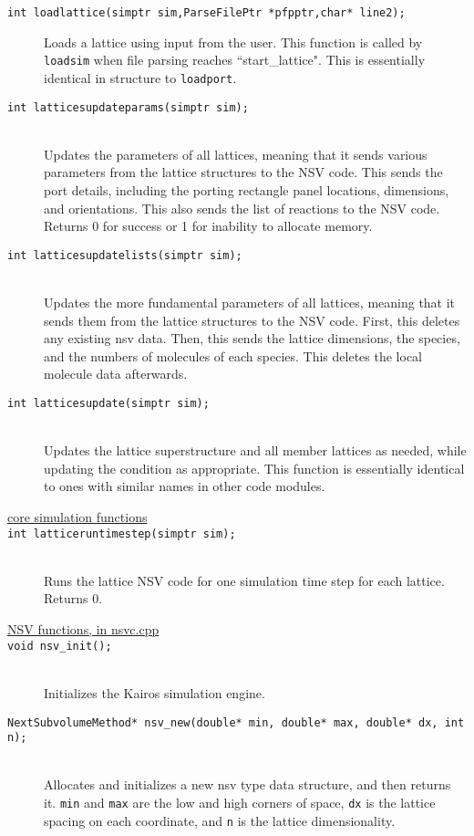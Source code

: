 \documentclass {book}
\begin{document}
\begin{description}
\item[\texttt{int loadlattice(simptr sim,ParseFilePtr *pfpptr,char* line2);}]
Loads a lattice using input from the user. This function is called by \texttt{loadsim} when file parsing reaches ``start\_lattice". This is essentially identical in structure to \texttt{loadport}.

\item[\texttt{int latticesupdateparams(simptr sim);}]
\hfill \\
Updates the parameters of all lattices, meaning that it sends various parameters from the lattice structures to the NSV code. This sends the port details, including the porting rectangle panel locations, dimensions, and orientations. This also sends the list of reactions to the NSV code. Returns 0 for success or 1 for inability to allocate memory.

\item[\texttt{int latticesupdatelists(simptr sim);}]
\hfill \\
Updates the more fundamental parameters of all lattices, meaning that it sends them from the lattice structures to the NSV code. First, this deletes any existing nsv data. Then, this sends the lattice dimensions, the species, and the numbers of molecules of each species. This deletes the local molecule data afterwards.

\item[\texttt{int latticesupdate(simptr sim);}]
\hfill \\
Updates the lattice superstructure and all member lattices as needed, while updating the condition as appropriate. This function is essentially identical to ones with similar names in other code modules.

\item[\underline{core simulation functions}]

\item[\texttt{int latticeruntimestep(simptr sim);}]
\hfill \\
Runs the lattice NSV code for one simulation time step for each lattice. Returns 0.

\item[\underline{NSV functions, in nsvc.cpp}]

\item[\texttt{void nsv\_init();}]
\hfill \\
Initializes the Kairos simulation engine.

\item[\texttt{NextSubvolumeMethod* nsv\_new(double* min, double* max, double* dx, int n);}]
\hfill \\
Allocates and initializes a new nsv type data structure, and then returns it. \texttt{min} and \texttt{max} are the low and high corners of space, \texttt{dx} is the lattice spacing on each coordinate, and \texttt{n} is the lattice dimensionality.


\end{description}
\end{document}
